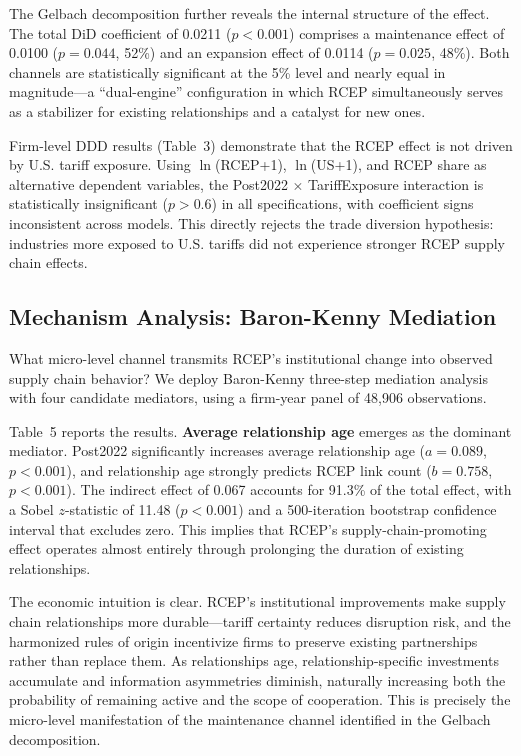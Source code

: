 \documentclass[preprint,12pt,authoryear]{elsarticle}
\begin{document}


The Gelbach decomposition further reveals the internal structure of the effect. The total DiD coefficient of 0.0211 ($p<0.001$) comprises a maintenance effect of 0.0100 ($p=0.044$, 52\%) and an expansion effect of 0.0114 ($p=0.025$, 48\%). Both channels are statistically significant at the 5\% level and nearly equal in magnitude—a ``dual-engine'' configuration in which RCEP simultaneously serves as a stabilizer for existing relationships and a catalyst for new ones.

Firm-level DDD results (Table~3) demonstrate that the RCEP effect is not driven by U.S. tariff exposure. Using $\ln$(RCEP+1), $\ln$(US+1), and RCEP share as alternative dependent variables, the Post2022 $\times$ TariffExposure interaction is statistically insignificant ($p>0.6$) in all specifications, with coefficient signs inconsistent across models. This directly rejects the trade diversion hypothesis: industries more exposed to U.S. tariffs did not experience stronger RCEP supply chain effects.



\subsection{Mechanism Analysis: Baron-Kenny Mediation}

What micro-level channel transmits RCEP's institutional change into observed supply chain behavior? We deploy Baron-Kenny three-step mediation analysis with four candidate mediators, using a firm-year panel of 48,906 observations.



Table~5 reports the results. \textbf{Average relationship age} emerges as the dominant mediator. Post2022 significantly increases average relationship age ($a=0.089$, $p<0.001$), and relationship age strongly predicts RCEP link count ($b=0.758$, $p<0.001$). The indirect effect of 0.067 accounts for 91.3\% of the total effect, with a Sobel $z$-statistic of 11.48 ($p<0.001$) and a 500-iteration bootstrap confidence interval that excludes zero. This implies that RCEP's supply-chain-promoting effect operates almost entirely through prolonging the duration of existing relationships.

The economic intuition is clear. RCEP's institutional improvements make supply chain relationships more durable—tariff certainty reduces disruption risk, and the harmonized rules of origin incentivize firms to preserve existing partnerships rather than replace them. As relationships age, relationship-specific investments accumulate and information asymmetries diminish, naturally increasing both the probability of remaining active and the scope of cooperation. This is precisely the micro-level manifestation of the maintenance channel identified in the Gelbach decomposition.
\end{document}
